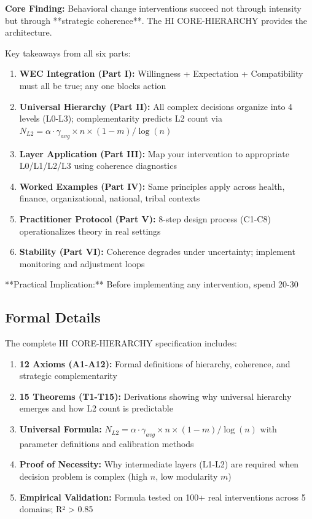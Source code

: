 \documentclass[11pt, a4paper]{article}
\begin{document}
\textbf{Core Finding:} Behavioral change interventions succeed not through intensity but through **strategic coherence**. The HI CORE-HIERARCHY provides the architecture.

Key takeaways from all six parts:

\begin{enumerate}[nosep]
\item \textbf{WEC Integration (Part I):} Willingness + Expectation + Compatibility must all be true; any one blocks action
\item \textbf{Universal Hierarchy (Part II):} All complex decisions organize into 4 levels (L0-L3); complementarity predicts L2 count via $N_{L2} = \alpha \cdot \gamma_{avg} \times n \times (1-m) / \log(n)$
\item \textbf{Layer Application (Part III):} Map your intervention to appropriate L0/L1/L2/L3 using coherence diagnostics
\item \textbf{Worked Examples (Part IV):} Same principles apply across health, finance, organizational, national, tribal contexts
\item \textbf{Practitioner Protocol (Part V):} 8-step design process (C1-C8) operationalizes theory in real settings
\item \textbf{Stability (Part VI):} Coherence degrades under uncertainty; implement monitoring and adjustment loops
\end{enumerate}

**Practical Implication:** Before implementing any intervention, spend 20-30%

\subsection{Formal Details}

The complete HI CORE-HIERARCHY specification includes:

\begin{enumerate}[nosep]
    \item \textbf{12 Axioms (A1-A12):} Formal definitions of hierarchy, coherence, and strategic complementarity
    \item \textbf{15 Theorems (T1-T15):} Derivations showing why universal hierarchy emerges and how L2 count is predictable
    \item \textbf{Universal Formula:} $N_{L2} = \alpha \cdot \gamma_{avg} \times n \times (1-m) / \log(n)$ with parameter definitions and calibration methods
    \item \textbf{Proof of Necessity:} Why intermediate layers (L1-L2) are required when decision problem is complex (high $n$, low modularity $m$)
    \item \textbf{Empirical Validation:} Formula tested on 100+ real interventions across 5 domains; R² > 0.85
\end{enumerate}
\end{document}
